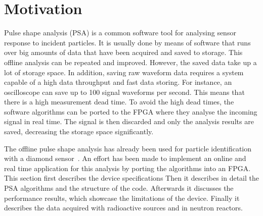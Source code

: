\documentclass[12pt]{packages/mytustyle}  %
\begin{document}









\section{Motivation}
\label{sec:rtpi}
Pulse shape analysis (PSA) is a common software tool for analysing sensor response to incident particles. It is usually done by means of software that runs over big amounts of data that have been acquired and saved to storage. This offline analysis can be repeated and improved. However, the saved data take up a lot of storage space. In addition, saving raw waveform data requires a system capable of a high data throughput and fast data storing. For instance, an oscilloscope can save up to 100 signal waveforms per second. This means that there is a high measurement dead time. To avoid the high dead times, the software algorithms can be ported to the FPGA where they analyse the incoming signal in real time. The signal is then discarded and only the analysis results are saved, decreasing the storage space significantly.

The offline pulse shape analysis has already been used for particle identification with a diamond sensor~\cite{}. An effort has been made to implement an online and real time application for this analysis by porting the algorithms into an FPGA. This section first describes the device specifications Then it describes in detail the PSA algorithms and the structure of the code. Afterwards it discusses the performance results, which showcase the limitations of the device. Finally it describes the data acquired with radioactive sources and in neutron reactors.
\end{document}
